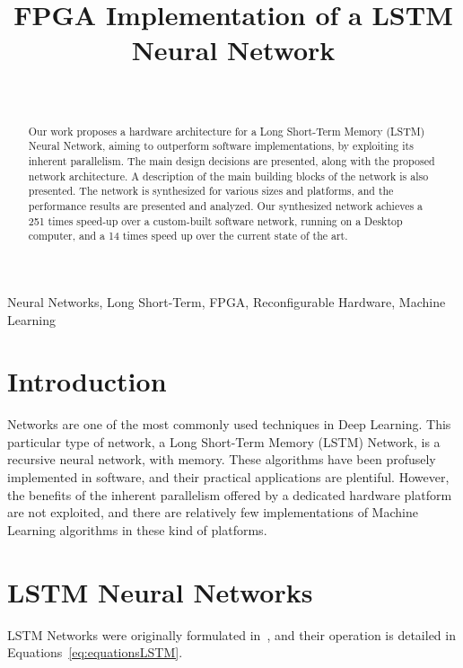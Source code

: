 \documentclass{IEEEtran}
\title{FPGA Implementation of a LSTM Neural Network}
\author{
\IEEEauthorblockN{José Fonseca\IEEEauthorrefmark{1}, João Canas Ferreira\IEEEauthorrefmark{1}, Ivo Timóteo\IEEEauthorrefmark{2}}\\
\IEEEauthorblockA{FEUP\IEEEauthorrefmark{1}, University of Cambridge\IEEEauthorrefmark{2}}
}
\begin{document}
\maketitle

\begin{abstract}
Our work proposes a hardware architecture for a Long Short-Term Memory (LSTM) Neural Network, aiming
to outperform software implementations, by exploiting its inherent parallelism.
The main design decisions are presented, along with the proposed network architecture. A description of the main
building blocks of the network is also presented. The network is synthesized for various sizes and platforms,
and the performance results are presented and analyzed. Our synthesized network achieves a 251 times speed-up
over a custom-built software network, running on a Desktop computer, and a 14 times speed up over the current state of the art.
\end{abstract}

\begin{IEEEkeywords}
Neural Networks, Long Short-Term, FPGA, Reconfigurable Hardware, Machine Learning
\end{IEEEkeywords}

\section{Introduction}\label{sec:intro}
 Networks are one of the most commonly used techniques in Deep Learning. This
particular type of network, a Long Short-Term Memory (LSTM) Network, is a recursive neural network, with memory.
These algorithms have been profusely implemented in software, and their practical applications are plentiful.
However, the benefits of the inherent parallelism offered by a dedicated hardware
platform are not exploited, and there are relatively few implementations of Machine Learning algorithms in
these kind of platforms.

\section{LSTM Neural Networks}\label{sec:lstmnn}
LSTM Networks were originally formulated in~\cite{Hoch97}, and their operation is detailed in Equations~\ref{eq:equationsLSTM}.
\end{document}
